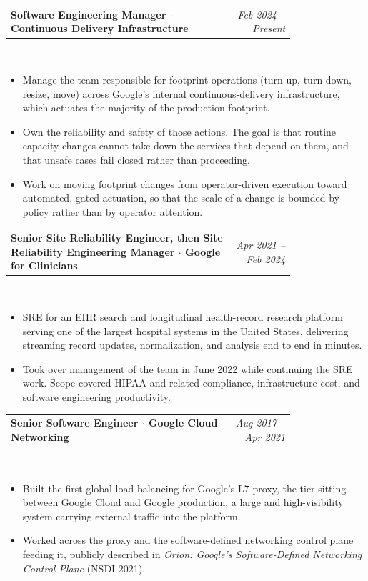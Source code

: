 \documentclass[10.5pt]{article}
\makeatletter
\newcommand{\role}[2]{%
  \noindent\begin{tabular*}{\linewidth}{@{}p{0.79\linewidth}@{\extracolsep{\fill}}r@{}}
  \textbf{#1} & \textit{#2}
  \end{tabular*}\\[0.5pt]
}
\makeatother
\begin{document}
\vspace{2pt}
\role{Software Engineering Manager $\cdot$ Continuous Delivery Infrastructure}{Feb 2024 -- Present}
\begin{itemize}
  \item Manage the team responsible for footprint operations (turn up, turn down, resize, move) across Google's internal continuous-delivery infrastructure, which actuates the majority of the production footprint.
  \item Own the reliability and safety of those actions. The goal is that routine capacity changes cannot take down the services that depend on them, and that unsafe cases fail closed rather than proceeding.
  \item Work on moving footprint changes from operator-driven execution toward automated, gated actuation, so that the scale of a change is bounded by policy rather than by operator attention.
\end{itemize}

\vspace{2pt}
\role{Senior Site Reliability Engineer, then Site Reliability Engineering Manager $\cdot$ Google for Clinicians}{Apr 2021 -- Feb 2024}
\begin{itemize}
  \item SRE for an EHR search and longitudinal health-record research platform serving one of the largest hospital systems in the United States, delivering streaming record updates, normalization, and analysis end to end in minutes.
  \item Took over management of the team in June 2022 while continuing the SRE work. Scope covered HIPAA and related compliance, infrastructure cost, and software engineering productivity.
\end{itemize}

\vspace{2pt}
\role{Senior Software Engineer $\cdot$ Google Cloud Networking}{Aug 2017 -- Apr 2021}
\begin{itemize}
  \item Built the first global load balancing for Google's L7 proxy, the tier sitting between Google Cloud and Google production, a large and high-visibility system carrying external traffic into the platform.
  \item Worked across the proxy and the software-defined networking control plane feeding it, publicly described in \emph{Orion: Google's Software-Defined Networking Control Plane} (NSDI 2021).
\end{itemize}
\end{document}

